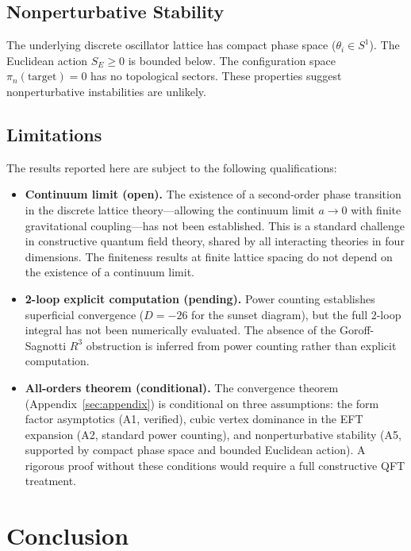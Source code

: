 \documentclass[aps,prd,reprint,nofootinbib]{revtex4-2}
\begin{document}
\subsection{Nonperturbative Stability}

The underlying discrete oscillator lattice has compact phase space ($\theta_i \in S^1$). The Euclidean action $S_E \geq 0$ is bounded below. The configuration space $\pi_n(\text{target}) = 0$ has no topological sectors. These properties suggest nonperturbative instabilities are unlikely.

\subsection{Limitations}
\label{sec:limitations}

The results reported here are subject to the following qualifications:

\begin{itemize}
\item \textbf{Continuum limit (open).} The existence of a second-order phase transition in the discrete lattice theory---allowing the continuum limit $a\to 0$ with finite gravitational coupling---has not been established. This is a standard challenge in constructive quantum field theory, shared by all interacting theories in four dimensions. The finiteness results at finite lattice spacing do not depend on the existence of a continuum limit.
\item \textbf{2-loop explicit computation (pending).} Power counting establishes superficial convergence ($D = -26$ for the sunset diagram), but the full 2-loop integral has not been numerically evaluated. The absence of the Goroff-Sagnotti $R^3$ obstruction is inferred from power counting rather than explicit computation.
\item \textbf{All-orders theorem (conditional).} The convergence theorem (Appendix~\ref{sec:appendix}) is conditional on three assumptions: the form factor asymptotics (A1, verified), cubic vertex dominance in the EFT expansion (A2, standard power counting), and nonperturbative stability (A5, supported by compact phase space and bounded Euclidean action). A rigorous proof without these conditions would require a full constructive QFT treatment.
\end{itemize}

\section{Conclusion}
\label{sec:conclusion}
\end{document}
